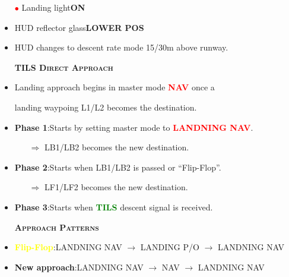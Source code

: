 \documentclass[a4paper,12pt,dvipsnames]{letter}
\newcommand{\rotb}[1]{\textcolor{red}  {\textbf{#1}}}
\newcommand{\grnb}[1]{\textcolor{Green}{\textbf{#1}}}
\newcommand{\gelbb}[1]{\textcolor{Yellow} {\textbf{#1}}}
\newcommand{\button}[1]{\textbf{#1}}
\newcommand{\myHead}[1]{{\LARGE\textsc{\textbf{#1}}}}
\newcommand{\ri}{\textcolor{red}{$\bullet$\;}}
\begin{document}
{\begin{itemize}
 \item[\ri] Landing light\dotfill\button{ON}
 \item HUD reflector glass\dotfill\button{LOWER POS}
 \item HUD changes to descent rate mode 15/30\;m above runway.
\end{itemize}
\newpage
\begin{itemize}
 \item [] \myHead{TILS Direct Approach}
 \item Landing approach begins in master mode \rotb{NAV} once a 
 \item[] landing waypoing L1/L2 becomes the destination.
 \item \textbf{Phase 1}:\;Starts by setting master mode to \rotb{LANDNING NAV}.
 \begin{itemize}
  \item[$\Rightarrow$] LB1/LB2 becomes the new destination.
 \end{itemize}
 \item \textbf{Phase 2}:\;Starts when LB1/LB2 is passed or ``Flip-Flop''.
 \begin{itemize}
  \item[$\Rightarrow$] LF1/LF2 becomes the new destination.
 \end{itemize} 
 \item \textbf{Phase 3}:\;Starts when \grnb{TILS} descent signal is received.
\end{itemize}
\newpage
\begin{itemize}
 \item [] \myHead{Approach Patterns}
 \item \gelbb{Flip-Flop}:\;LANDNING NAV $\rightarrow$ LANDING P/O $\rightarrow$ LANDNING NAV
 \item \textbf{New approach}:\;LANDNING NAV $\rightarrow$ NAV $\rightarrow$ LANDNING NAV
\end{itemize}
}
\end{document}
